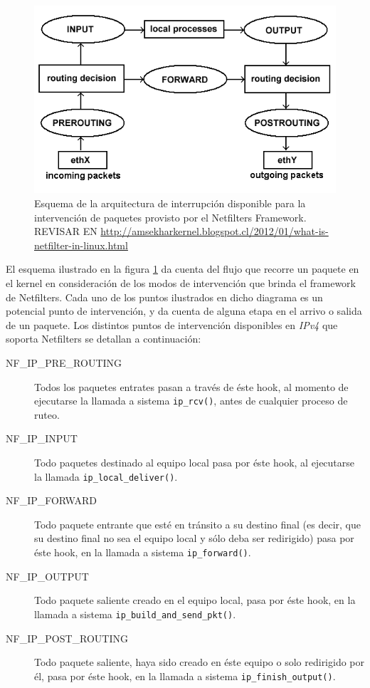 \begin{figure}[!h]
	\centering
	\includegraphics[scale=.5]{imagenes/netfilterArchitecture}
	\caption{Esquema de la arquitectura de interrupción disponible para la intervención de paquetes provisto por el Netfilters Framework. REVISAR EN \url{http://amsekharkernel.blogspot.cl/2012/01/what-is-netfilter-in-linux.html}}
	\label{fig:netfilterArchitecture}
\end{figure}

El esquema ilustrado en la figura \ref{fig:netfilterArchitecture} da cuenta del flujo que recorre un paquete en el kernel en consideración de los modos de intervención que brinda el framework de Netfilters. Cada uno de los puntos ilustrados en dicho diagrama es un potencial punto de intervención, y da cuenta de alguna etapa en el arrivo o salida de un paquete. Los distintos puntos de intervención disponibles en \emph{IPv4} que soporta Netfilters se detallan a continuación:

\begin{description}
\item[NF\_IP\_PRE\_ROUTING] Todos los paquetes entrates pasan a través de éste hook, al momento de ejecutarse la llamada a sistema \verb=ip_rcv()=, antes de cualquier proceso de ruteo.
\item[NF\_IP\_INPUT] Todo paquetes destinado al equipo local pasa por éste hook, al ejecutarse la llamada \verb=ip_local_deliver()=.
\item[NF\_IP\_FORWARD] Todo paquete entrante que esté en tránsito a su destino final (es decir, que su destino final no sea el equipo local y sólo deba ser redirigido) pasa por éste hook, en la llamada a sistema \verb=ip_forward()=.
\item[NF\_IP\_OUTPUT] Todo paquete saliente creado en el equipo local, pasa por éste hook, en la llamada a sistema \verb=ip_build_and_send_pkt()=.
\item[NF\_IP\_POST\_ROUTING] Todo paquete saliente, haya sido creado en éste equipo o solo redirigido por él, pasa por éste hook, en la llamada a sistema \verb=ip_finish_output()=.
\end{description}

